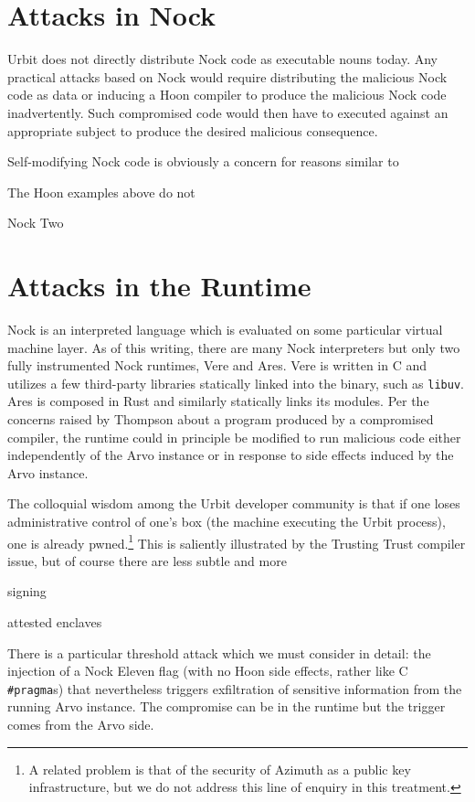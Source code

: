 \documentclass[twoside]{article}
\begin{document}
\section{Attacks in Nock}

Urbit does not directly distribute Nock code as executable nouns today.  Any practical attacks based on Nock would require distributing the malicious Nock code as data or inducing a Hoon compiler to produce the malicious Nock code inadvertently.  Such compromised code would then have to executed against an appropriate subject to produce the desired malicious consequence.

Self-modifying Nock code is obviously a concern for reasons similar to 


The Hoon examples above do not

Nock Two


\section{Attacks in the Runtime}

Nock is an interpreted language which is evaluated on some particular virtual machine layer.  As of this writing, there are many Nock interpreters \cite{Nock2023} but only two fully instrumented Nock runtimes, Vere and Ares.  Vere is written in C and utilizes a few third-party libraries statically linked into the binary, such as \texttt{libuv}.  Ares is composed in Rust and similarly statically links its modules.  Per the concerns raised by Thompson about a program produced by a compromised compiler, the runtime could in principle be modified to run malicious code either independently of the Arvo instance or in response to side effects induced by the Arvo instance.

The colloquial wisdom among the Urbit developer community is that if one loses administrative control of one's box (the machine executing the Urbit process), one is already pwned.\footnote{A related problem is that of the security of Azimuth as a public key infrastructure, but we do not address this line of enquiry in this treatment.}  This is saliently illustrated by the Trusting Trust compiler issue, but of course there are less subtle and more

signing

attested enclaves

There is a particular threshold attack which we must consider in detail:  the injection of a Nock Eleven flag (with no Hoon side effects, rather like C \texttt{#pragma}s) that nevertheless triggers exfiltration of sensitive information from the running Arvo instance.  The compromise can be in the runtime but the trigger comes from the Arvo side.
\end{document}
